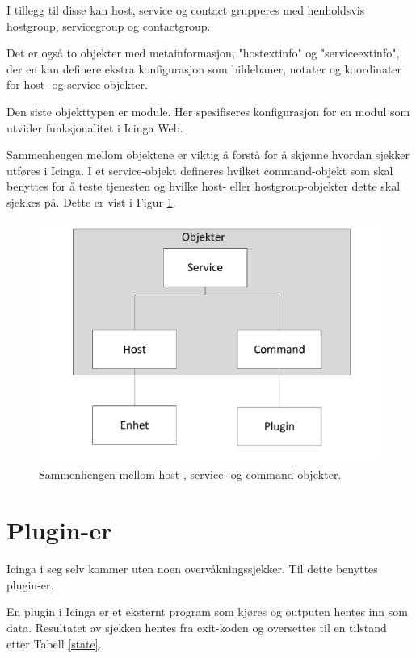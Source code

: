 I tillegg til disse kan host, service og contact grupperes med henholdsvis hostgroup, servicegroup og contactgroup.

Det er også to objekter med metainformasjon, "hostextinfo" og "serviceextinfo", der en kan definere ekstra konfigurasjon som bildebaner, notater og koordinater for host- og service-objekter.

Den siste objekttypen er module. Her spesifiseres konfigurasjon for en modul som utvider funksjonalitet i Icinga Web.

Sammenhengen mellom objektene er viktig å forstå for å skjønne hvordan sjekker utføres i Icinga. I et service-objekt defineres hvilket command-objekt som skal benyttes for å teste tjenesten og hvilke host- eller hostgroup-objekter dette skal sjekkes på. Dette er vist i Figur \ref{command_host_service}.

\begin{figure}[H]
    \centering
    \includegraphics[scale=0.4]{img/command_host_service}
    \caption{Sammenhengen mellom host-, service- og command-objekter.}
    \label{command_host_service}
\end{figure}

\section{Plugin-er}
Icinga i seg selv kommer uten noen overvåkningssjekker. Til dette benyttes plugin-er.

En plugin i Icinga er et eksternt program som kjøres og outputen hentes inn som data. Resultatet av sjekken hentes fra exit-koden\cite{wiki:returncode} og oversettes til en tilstand etter Tabell \ref{state}.

